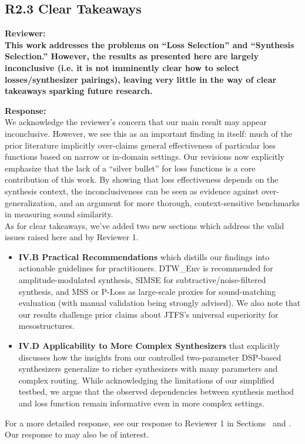\documentclass[11pt]{article}
\begin{document}
\subsection*{R2.3 Clear Takeaways}
\noindent\textbf{Reviewer:}\\
\textbf{This work addresses the problems on ``Loss Selection'' and ``Synthesis Selection.''  However, the results as presented here are largely inconclusive (i.e. it is not imminently clear how to select losses/synthesizer pairings), leaving very little in the way of clear takeaways sparking future research.\\}

\noindent\textbf{Response:} \\
We acknowledge the reviewer’s concern that our main result may appear inconclusive. However, we see this as an important finding in itself: much of the prior literature implicitly over-claims general effectiveness of particular loss functions based on narrow or in-domain settings. Our revisions now explicitly emphasize that the lack of a “silver bullet” for loss functions is a core contribution of this work. By showing that loss effectiveness depends on the synthesis context, the inconclusiveness can be seen as evidence against over-generalization, and an argument for more thorough, context-sensitive benchmarks in measuring sound similarity.\\

As for clear takeaways, we've added two new sections which address the valid issues raised here and by Reviewer 1. 

\begin{itemize}
  \item \textbf{IV.B Practical Recommendations} which distills our findings into actionable guidelines for practitioners. DTW\_Env is recommended for amplitude-modulated synthesis, SIMSE for subtractive/noise-filtered synthesis, and MSS or P-Loss as large-scale proxies for sound-matching evaluation (with manual validation being strongly advised). We also note that our results challenge prior claims about JTFS’s universal superiority for mesostructures.
  \item \textbf{IV.D Applicability to More Complex Synthesizers} that explicitly discusses how the insights from our controlled two-parameter DSP-based synthesizers generalize to richer synthesizers with many parameters and complex routing. While acknowledging the limitations of our simplified testbed, we argue that the observed dependencies between synthesis method and loss function remain informative even in more complex settings.
\end{itemize}
For a more detailed response, see our response to Reviewer 1 in Sections~ and . Our response to  may also be of interest.
\end{document}

